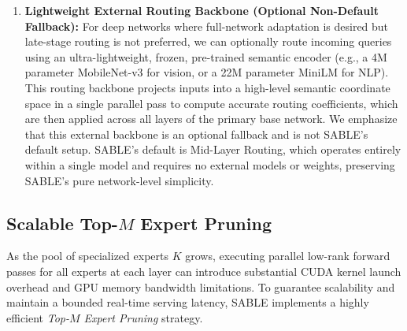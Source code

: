 \begin{enumerate}
    SABLE's Late Adaptation configuration is therefore structurally limited to expert pools whose task-specific adaptation is concentrated in late-stage layers, or where the early-layer parameters of the experts are identical (or highly similar) to those of the base network. If downstream experts are trained with full full-parameter fine-tuning or low-level PEFT adapters that aggressively specialize early-layer feature extractors (e.g., for low-level domain adaptation or sensor-modality shifts), SABLE Late Adaptation is structurally unable to leverage those early features. In such scenarios, practitioners must either accept representational drift across early layers by routing from Layer 0, or utilize SABLE's alternative \emph{Lightweight External Routing Backbone} to route ensembling across all layers, highlighting a key design choice of the SABLE framework.
    \item \textbf{Lightweight External Routing Backbone (Optional Non-Default Fallback):} For deep networks where full-network adaptation is desired but late-stage routing is not preferred, we can optionally route incoming queries using an ultra-lightweight, frozen, pre-trained semantic encoder (e.g., a 4M parameter MobileNet-v3 for vision, or a 22M parameter MiniLM for NLP). This routing backbone projects inputs into a high-level semantic coordinate space in a single parallel pass to compute accurate routing coefficients, which are then applied across all layers of the primary base network. We emphasize that this external backbone is an optional fallback and is not SABLE's default setup. SABLE's default is Mid-Layer Routing, which operates entirely within a single model and requires no external models or weights, preserving SABLE's pure network-level simplicity.
\end{enumerate}

\subsection{Scalable Top-$M$ Expert Pruning}
As the pool of specialized experts $K$ grows, executing parallel low-rank forward passes for all experts at each layer can introduce substantial CUDA kernel launch overhead and GPU memory bandwidth limitations. To guarantee scalability and maintain a bounded real-time serving latency, SABLE implements a highly efficient \emph{Top-$M$ Expert Pruning} strategy. 

